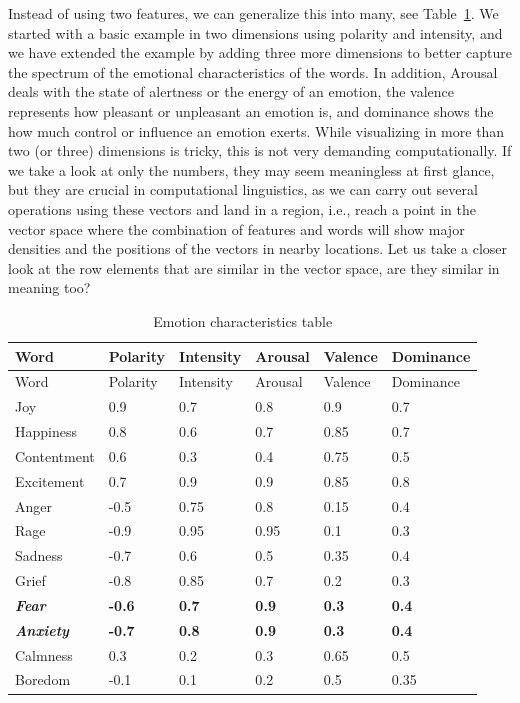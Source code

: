 Instead of using two features, we can generalize this into many, see
Table~\ref{tbl-emot2}. We started with a basic example in two dimensions
using polarity and intensity, and we have extended the example by adding
three more dimensions to better capture the spectrum of the emotional characteristics of the
words. In addition, Arousal deals with the state of alertness or the energy of an emotion, the valence represents how pleasant or
unpleasant an emotion is, and dominance shows the how much control or
influence an emotion exerts. While visualizing in more than two (or
three) dimensions is tricky, this is not very
demanding computationally. If we take a look at only the numbers, they may seem
meaningless at first glance, but they are crucial in computational
linguistics, as we can carry out several operations using these vectors and
land in a region, i.e., reach a point in the vector space where the
combination of features and words will show major densities and the positions of
the vectors in nearby locations. Let us take a closer look at the row
elements that are similar in the vector space, are they similar in
meaning too?

\begin{longtable}[]{@{}llllll@{}}
\caption{Emotion characteristics table}\label{tbl-emot2}\tabularnewline
\toprule\noalign{}
Word & Polarity & Intensity & Arousal & Valence & Dominance \\
\midrule\noalign{}
\endfirsthead
\toprule\noalign{}
Word & Polarity & Intensity & Arousal & Valence & Dominance \\
\midrule\noalign{}
\endhead
\bottomrule\noalign{}
\endlastfoot
Joy & 0.9 & 0.7 & 0.8 & 0.9 & 0.7 \\
Happiness & 0.8 & 0.6 & 0.7 & 0.85 & 0.7 \\
Contentment & 0.6 & 0.3 & 0.4 & 0.75 & 0.5 \\
Excitement & 0.7 & 0.9 & 0.9 & 0.85 & 0.8 \\
Anger & -0.5 & 0.75 & 0.8 & 0.15 & 0.4 \\
Rage & -0.9 & 0.95 & 0.95 & 0.1 & 0.3 \\
Sadness & -0.7 & 0.6 & 0.5 & 0.35 & 0.4 \\
Grief & -0.8 & 0.85 & 0.7 & 0.2 & 0.3 \\
\textbf{\emph{Fear}} & \textbf{-0.6} & \textbf{0.7} & \textbf{0.9} &
\textbf{0.3} & \textbf{0.4} \\
\textbf{\emph{Anxiety}} & \textbf{-0.7} & \textbf{0.8} & \textbf{0.9} &
\textbf{0.3} & \textbf{0.4} \\
Calmness & 0.3 & 0.2 & 0.3 & 0.65 & 0.5 \\
Boredom & -0.1 & 0.1 & 0.2 & 0.5 & 0.35 \\
\end{longtable}


